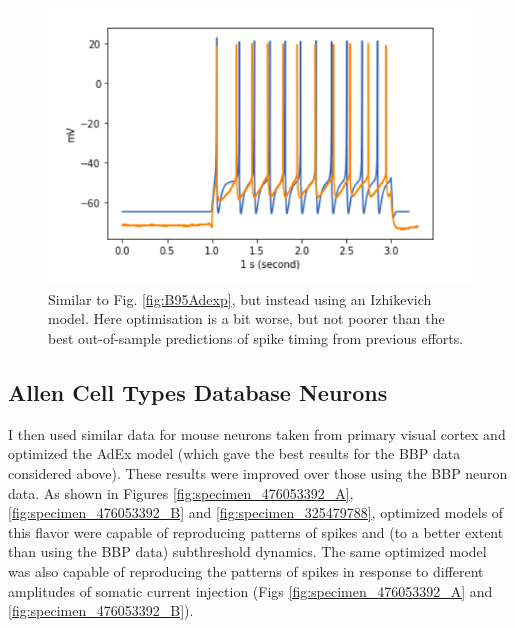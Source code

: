 \begin{figure}
    \centering
    \includegraphics{figures/IZHI_B95.png}
    \caption[Optimized Izhikevich Model from BBP]{ Similar to Fig. \ref{fig:B95Adexp}, but instead using an Izhikevich model.
    Here optimisation is a bit worse, but not poorer than the best out-of-sample predictions of spike timing from previous efforts.}
    \label{fig:B95_IZHI}
\end{figure}

\subsection{Allen Cell Types Database Neurons}
I then used similar data for mouse neurons taken from primary visual cortex and optimized the AdEx model (which gave the best results for the BBP data considered above).
These results were improved over those using the BBP neuron data.
As shown in Figures \ref{fig:specimen_476053392_A}, \ref{fig:specimen_476053392_B} and \ref{fig:specimen_325479788}, optimized models of this flavor were capable of reproducing patterns of spikes and (to a better extent than using the BBP data) subthreshold dynamics.
The same optimized model was also capable of reproducing the patterns of spikes in response to different amplitudes of somatic current injection (Figs \ref{fig:specimen_476053392_A} and \ref{fig:specimen_476053392_B}).


